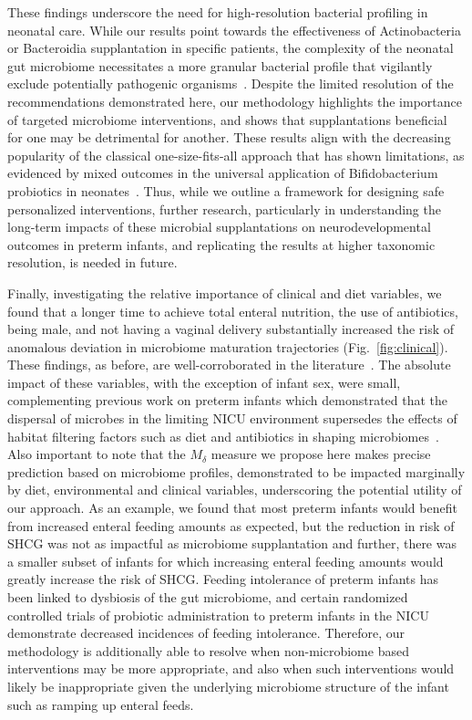 \documentclass[onecolumn,10pt]{IEEEtran}
\def\erisk{$M_\delta$\xspace}
\def\bact{Bacteroidia\xspace}
\def\actn{Actinobacteria\xspace}
\begin{document}
These findings underscore  the  need for high-resolution bacterial profiling in neonatal care. While our results point towards the   effectiveness of \actn or  \bact supplantation in specific patients, the complexity of the neonatal gut microbiome necessitates a more granular  bacterial profile that vigilantly exclude potentially pathogenic organisms~\cite{Khanna_2020,michailidis2021adverse}. Despite the limited resolution of the recommendations demonstrated here, our methodology highlights  the importance of targeted microbiome interventions, and shows that supplantations beneficial for one may  be detrimental for another. These results align with the decreasing popularity of the classical  one-size-fits-all approach that has shown limitations, as evidenced by mixed outcomes in the universal application of Bifidobacterium  probiotics in neonates~\cite{ohishi2010bifidobacterium,weber2015bifidobacterium}. Thus, while we outline  a  framework for designing safe personalized  interventions,  further research, particularly in understanding the long-term impacts of these microbial supplantations on neurodevelopmental outcomes in preterm infants, and replicating the results at higher taxonomic resolution, is needed in future.

Finally, investigating  the relative importance of clinical and diet variables, we found that a longer time to achieve total enteral nutrition, the use of antibiotics, being male, and not having a vaginal delivery substantially increased the risk of anomalous deviation in microbiome maturation trajectories (Fig.~\ref{fig:clinical}). These findings, as before, are well-corroborated in the literature~\cite{xu2018systematic,reyman2022effects,gibson2015antibiotics,coelho2021acquisition,javsarevic2016sex}. The absolute impact of these  variables, with the exception of infant sex,  were small,  complementing previous work on preterm infants which demonstrated that the dispersal of microbes in the limiting NICU environment supersedes the effects of habitat filtering factors such as diet and antibiotics in shaping microbiomes~\cite{oliphant2021bacteroidota}. Also important to note that the \erisk measure we propose here makes precise prediction based on microbiome profiles, demonstrated to be impacted marginally by diet, environmental and clinical variables, underscoring the  potential utility of our approach. As an example, we found that most preterm infants would benefit from increased enteral feeding amounts as expected, but the reduction in risk of SHCG was not as impactful as microbiome supplantation and further, there was a smaller subset of infants for which increasing enteral feeding amounts would greatly increase the risk of SHCG. Feeding intolerance of preterm infants has been linked to dysbiosis of the gut microbiome\cite{hu2021altered,liu2022early}, and certain randomized controlled trials of probiotic administration to preterm infants in the NICU demonstrate decreased incidences of feeding intolerance\cite{mitha2022neonatal,alshaikh2022multi,qiao2017effect}. Therefore, our methodology is additionally able to resolve when non-microbiome based interventions may be more appropriate, and also when such interventions would likely be inappropriate given the underlying microbiome structure of the infant such as ramping up enteral feeds. 
  
\end{document}
